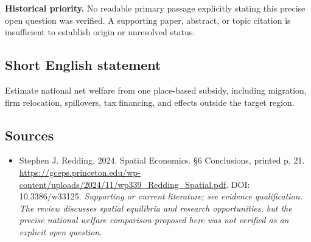 \documentclass[11pt]{article}
\begin{document}
\par\textbf{Historical priority.} No readable primary passage explicitly stating this precise open question was verified. A supporting paper, abstract, or topic citation is insufficient to establish origin or unresolved status.

\subsection{Short English statement}
Estimate national net welfare from one place-based subsidy, including migration, firm relocation, spillovers, tax financing, and effects outside the target region.

\subsection{Sources}
\begin{itemize}\raggedright
\item[\textnormal{[S1]}]\hypertarget{source:30007749:1}{} Stephen J. Redding. 2024. Spatial Economics. §6 Conclusions, printed p. 21.
\url{https://gceps.princeton.edu/wp-content/uploads/2024/11/wp339_Redding_Spatial.pdf}.
DOI: 10.3386/w33125.
{\small\textit{Supporting or current literature; see evidence qualification. The review discusses spatial equilibria and research opportunities, but the precise national welfare comparison proposed here was not verified as an explicit open question.}}
\end{itemize}
\end{document}
